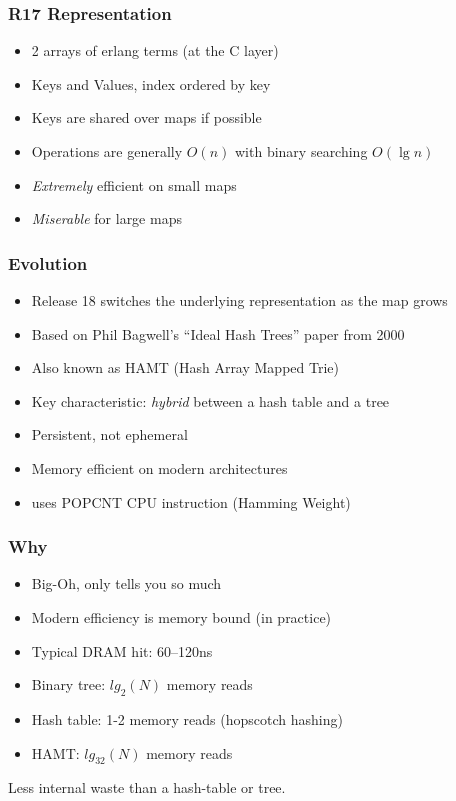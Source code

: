 \documentclass[lualatex]{beamer}
\begin{document}
\begin{frame}
\frametitle{R17 Representation}
\begin{itemize}
\item 2 arrays of erlang terms (at the C layer)
\item Keys and Values, index ordered by key
\item Keys are shared over maps if possible
\item Operations are generally $O(n)$ with binary searching $O(\lg n)$
\item \emph{Extremely} efficient on small maps
\item \emph{Miserable} for large maps
\end{itemize}
\end{frame}

\begin{frame}
\frametitle{Evolution}
\begin{itemize}
\item Release 18 switches the underlying representation as the map grows
\item Based on Phil Bagwell's ``Ideal Hash Trees'' paper from 2000
\item Also known as HAMT (Hash Array Mapped Trie)
\item Key characteristic: \emph{hybrid} between a hash table and a tree
\item Persistent, not ephemeral
\item Memory efficient on modern architectures
\item uses POPCNT CPU instruction (Hamming Weight)
\end{itemize}
\end{frame}

\begin{frame}
\frametitle{Why}
\begin{itemize}
\item Big-Oh, only tells you so much
\item Modern efficiency is memory bound (in practice)
\item Typical DRAM hit: 60–120ns
\item Binary tree: $lg_2(N)$ memory reads
\item Hash table: 1-2 memory reads (hopscotch hashing)
\item HAMT: $lg_{32}(N)$ memory reads
\end{itemize}
Less internal waste than a hash-table or tree.
\end{frame}
\end{document}
